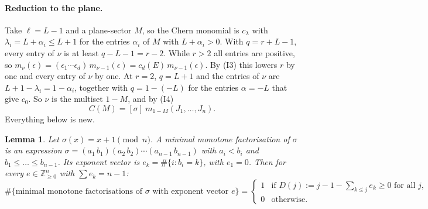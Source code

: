 \documentclass[11pt,a4paper]{article}
\theoremstyle{plain}
\newtheorem{lemma}[theorem]{Lemma}
\theoremstyle{definition}
\theoremstyle{remark}
\begin{document}
\paragraph{Reduction to the plane.} Take $\ell = L - 1$ and a plane-sector $M$, so the Chern monomial
is $c_\lambda$ with $\lambda_i = L + \alpha_i \le L + 1$ for the entries $\alpha_i$ of $M$ with
$L + \alpha_i > 0$. With $q = r + L - 1$, every entry of $\nu$ is at least $q - L - 1 = r - 2$. While
$r > 2$ all entries are positive, so $m_\nu(\epsilon) = (\epsilon_1 \cdots \epsilon_d)\,
m_{\nu - 1}(\epsilon) = c_d(E)\, m_{\nu-1}(\epsilon)$. By (I3) this lowers $r$ by one and every entry
of $\nu$ by one. At $r = 2$, $q = L + 1$ and the entries of $\nu$ are $L + 1 - \lambda_i = 1 - \alpha_i$,
together with $q = 1 - (-L)$ for the entries $\alpha = -L$ that give $c_0$. So $\nu$ is the
multiset $1 - M$, and by (I4)
\[
  C(M) = [\sigma]\ m_{1 - M}(J_1, \dots, J_n).
\]
Everything below is new.

\begin{lemma}\label{lem:monotone}
Let $\sigma(x) = x + 1 \pmod n$. A \emph{minimal monotone factorisation} of $\sigma$ is an expression
$\sigma = (a_1\,b_1)(a_2\,b_2)\cdots(a_{n-1}\,b_{n-1})$ with $a_i < b_i$ and $b_1 \le \dots \le
b_{n-1}$. Its exponent vector is $e_k = \#\{i : b_i = k\}$, with $e_1 = 0$. Then for every
$e \in \mathbb{Z}_{\ge 0}^n$ with $\sum e_k = n - 1$:
\[
  \#\{\text{minimal monotone factorisations of } \sigma \text{ with exponent vector } e\}
  = \begin{cases} 1 & \text{if } D(j) := j - 1 - \sum_{k \le j} e_k \ge 0 \text{ for all } j, \\
                  0 & \text{otherwise.} \end{cases}
\]
\end{lemma}
\end{document}
